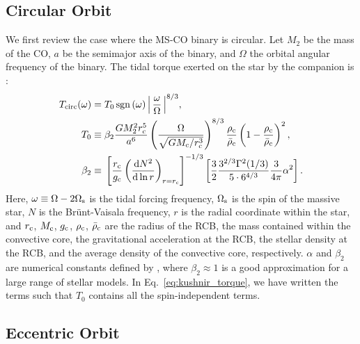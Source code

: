 \documentclass[
        fleqn,
        usenatbib,
    ]{mnras}
\newcommand*{\rd}[2]{\frac{\mathrm{d}#1}{\mathrm{d}#2}}
\newcommand*{\p}[1]{\left(#1\right)}
\newcommand*{\s}[1]{\left[#1\right]}
\DeclareMathOperator*{\sgn}{sgn}
\begin{document}
\subsection{Circular Orbit}

We first review the case where the MS-CO binary is circular. Let $M_2$ be the
mass of the CO, $a$ be the semimajor axis of the binary, and $\Omega$ the
orbital angular frequency of the binary. The tidal torque exerted on the star by
the companion is \citep{kushnir}:
\begin{align}
    T_{\rm circ}(\omega) ={}& T_0 \sgn\p{\omega}
        \Big|\,\frac{\omega}{\Omega}\,\Big|^{8/3} \label{eq:kushnir_torque},\\
    T_0 \equiv{}& \beta_2\frac{GM_2^2r_{\rm c}^5}{a^6}
            \p{\frac{\Omega}{\sqrt{GM_{\rm c}/r_{\rm c}^3}}}^{8/3}
            \frac{\rho_{\rm c}}{\bar{\rho}_{\rm c}} \p{1 - \frac{\rho_{\rm
            c}}{\bar{\rho}_{\rm c}}}^2,\\
    \beta_2 \equiv{}&
        \s{\frac{r_{\rm c}}{g_{\rm c}}
            \p{\rd{N^2}{\ln r}}_{r = r_{\rm c}}}^{-1/3}
                \s{\frac{3}{2}\frac{3^{2/3}\Gamma^2(1/3)}{5 \cdot
                6^{4/3}} \frac{3}{4\pi}\alpha^2}.
\end{align}
Here, $\omega \equiv \Omega - 2\Omega_{\rm s}$ is the tidal forcing frequency,
$\Omega_{\rm s}$ is the spin of the massive star, $N$ is the Br\"unt-Vaisala
frequency, $r$ is the radial coordinate within the star, and $r_{\rm c}$,
$M_{\rm c}$, $g_{\rm c}$, $\rho_{\rm c}$, $\bar{\rho}_{\rm c}$ are the radius of
the RCB, the mass contained within the convective core, the gravitational
acceleration at the RCB, the stellar density at the RCB, and the average density
of the convective core, respectively. $\alpha$ and $\beta_2$ are numerical
constants defined by \citet{kushnir}, where $\beta_2 \approx 1$ is a good
approximation for a large range of stellar models. In
Eq.~\eqref{eq:kushnir_torque}, we have written the terms such that $T_0$
contains all the spin-independent terms.

\subsection{Eccentric Orbit}
\end{document}
